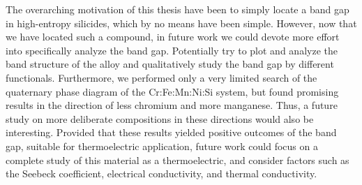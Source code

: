 \documentclass[UKenglish]{ifimaster}  %
\begin{document}
The overarching motivation of this thesis have been to simply locate a band gap in high-entropy silicides, which by no means have been simple. However, now that we have located such a compound, in future work we could devote more effort into specifically analyze the band gap. Potentially try to plot and analyze the band structure of the alloy and qualitatively study the band gap by different functionals. Furthermore, we performed only a very limited search of the quaternary phase diagram of the Cr:Fe:Mn:Ni:Si system, but found promising results in the direction of less chromium and more manganese. Thus, a future study on more deliberate compositions in these directions would also be interesting. Provided that these results yielded positive outcomes of the band gap, suitable for thermoelectric application, future work could focus on a complete study of this material as a thermoelectric, and consider factors such as the Seebeck coefficient, electrical conductivity, and thermal conductivity. 


\appendix


\backmatter{}
\printbibliography
\end{document}
